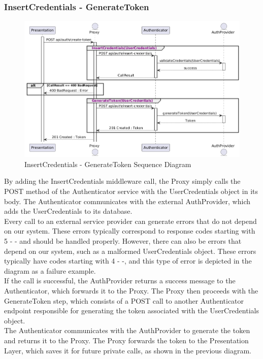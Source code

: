 \subsubsection*{InsertCredentials - GenerateToken}
\begin{figure}[H]
    \centering
    \includegraphics[width=\linewidth]{Latex/Images/DD/SequenceDiagrams/1.1InsertCredentialsGenerateToken.png}
    \caption{InsertCredentials - GenerateToken Sequence Diagram}
    \label{fig:generatetoken}
\end{figure}
By adding the InsertCredentials middleware call, the Proxy simply calls the POST method of the Authenticator service with the UserCredentials object in its body.
The Authenticator communicates with the external AuthProvider, which adds the UserCredentials to its database.\\
Every call to an external service provider can generate errors that do not depend on our system. These errors typically correspond to response codes starting with 5 - -  and should be handled properly.
However, there can also be errors that depend on our system, such as a malformed UserCredentials object. These errors typically have codes starting with 4 - -, and this type of error is depicted in the diagram as a failure example.\\
If the call is successful, the AuthProvider returns a success message to the Authenticator, which forwards it to the Proxy. The Proxy then proceeds with the GenerateToken step, which consists of a POST call to another Authenticator endpoint responsible for generating the token associated with the UserCredentials object.\\
The Authenticator communicates with the AuthProvider to generate the token and returns it to the Proxy. The Proxy forwards the token to the Presentation Layer, which saves it for future private calls, as shown in the previous diagram.

